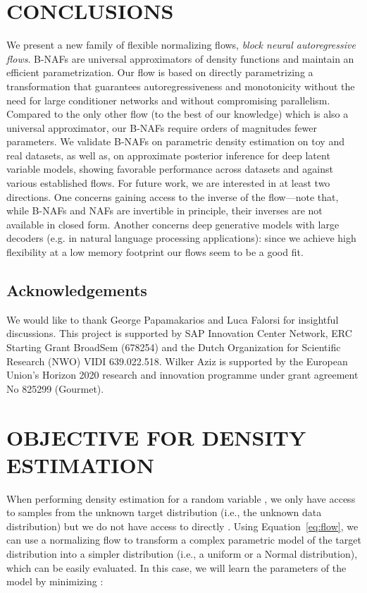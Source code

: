 \documentclass[letterpaper]{article}
\begin{document}
\section{CONCLUSIONS}
We present a new family of flexible normalizing flows, \emph{block neural autoregressive flows}. B-NAFs are universal approximators of density functions and maintain an efficient parametrization. Our flow is based on directly parametrizing a transformation that guarantees autoregressiveness and monotonicity without the need for large conditioner networks and without compromising parallelism. Compared to the only other flow (to the best of our knowledge) which is also a universal approximator, our B-NAFs require orders of magnitudes fewer parameters. We validate B-NAFs on parametric density estimation on toy and real datasets, as well as, on approximate posterior inference for deep latent variable models, showing favorable performance across datasets and against various established flows. For future work, we are interested in at least two directions. One concerns gaining access to the inverse of the flow---note that, while B-NAFs and NAFs are invertible in principle, their inverses are not available in closed form. Another concerns deep generative models with large decoders (e.g. in natural language processing applications): since we achieve high flexibility at a low memory footprint our flows seem to be a good fit.

\subsection*{Acknowledgements}
We would like to thank George Papamakarios and Luca Falorsi for insightful discussions. This project is supported by SAP Innovation Center Network, ERC Starting Grant BroadSem (678254) and the Dutch Organization for Scientific Research (NWO) VIDI 639.022.518. Wilker Aziz is supported by the European Union's Horizon 2020 research and innovation programme under grant agreement No 825299 (Gourmet).



\clearpage

\onecolumn
\appendix

\section{OBJECTIVE FOR DENSITY ESTIMATION} \label{app:kl_desity_estimation}
When performing density estimation for a random variable , we only have access to samples from the unknown target distribution  (i.e., the unknown data distribution) but we do not have access to  directly \citep{papamakarios2017masked}. Using Equation~\ref{eq:flow}, we can use a normalizing flow to transform a complex parametric model  of the target distribution into a simpler distribution  (i.e., a uniform or a Normal distribution), which can be easily evaluated. In this case, we will learn the parameters  of the model by minimizing :
\end{document}

